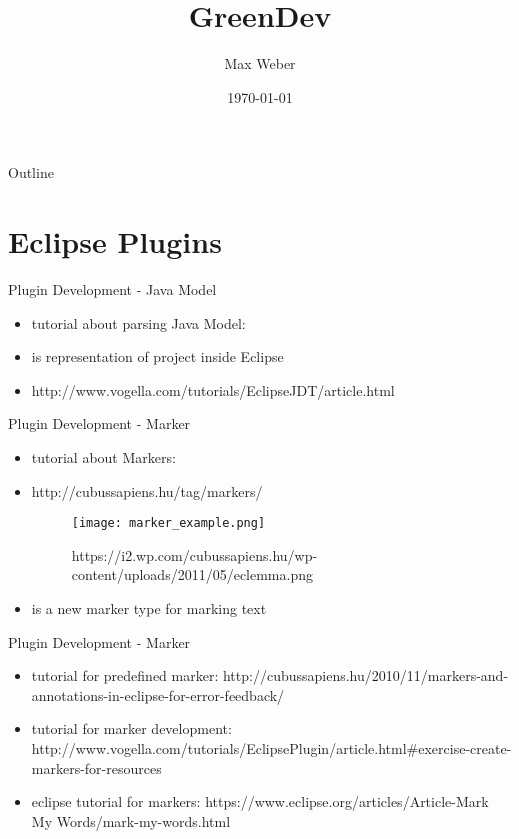 \documentclass[11pt,aspectratio=169]{beamer}
\title[Green Development]{GreenDev}
\author[M. Weber]{Max Weber}
\institute[Bauhaus-Universität Weimar]{}
\date[\today]{\today}
\begin{document}

\maketitle

\begin{frame}{Outline}
\tableofcontents
\end{frame}

\section{Eclipse Plugins}

\begin{frame}{Plugin Development - Java Model}
  \begin{itemize}
    \item tutorial about parsing Java Model: 
    \item is representation of project inside Eclipse
    \item http://www.vogella.com/tutorials/EclipseJDT/article.html
  \end{itemize}
\end{frame}

\begin{frame}{Plugin Development - Marker}
  \begin{itemize}
    \item tutorial about Markers: 
    \item http://cubussapiens.hu/tag/markers/
    \begin{figure}[ht]
      \texttt{[image: marker\_example.png]}
      \caption{https://i2.wp.com/cubussapiens.hu/wp-content/uploads/2011/05/eclemma.png}
      \label{fig3}
    \end{figure}
    \item is a new marker type for marking text
  \end{itemize}
\end{frame}


\begin{frame}{Plugin Development - Marker}
  \begin{itemize}
    \item tutorial for predefined marker: \newline http://cubussapiens.hu/2010/11/markers-and-annotations-in-eclipse-for-error-feedback/
    \item tutorial for marker development: \newline http://www.vogella.com/tutorials/EclipsePlugin/article.html\#exercise-create-markers-for-resources
    \item eclipse tutorial for markers: \newline https://www.eclipse.org/articles/Article-Mark My Words/mark-my-words.html
  \end{itemize}
\end{frame}
\end{document}
